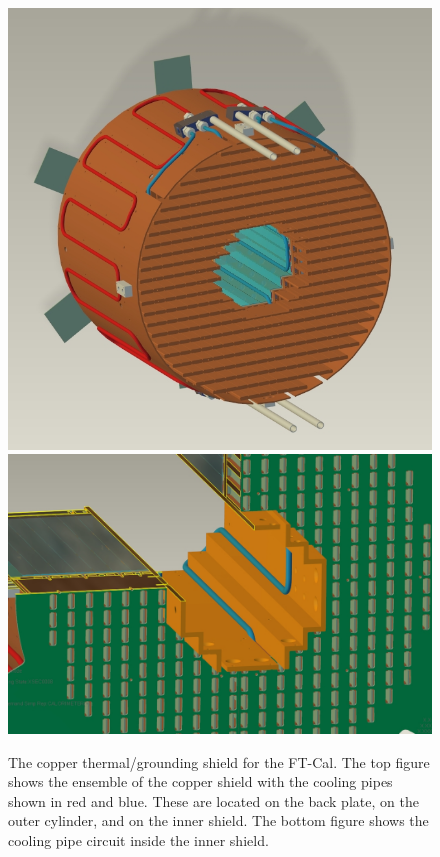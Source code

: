 \begin{figure}[th!]
\centering 
\includegraphics[width=1.0\columnwidth]{./fig/raff.jpeg}
\includegraphics[width=1.0\columnwidth]{./fig/raff1.jpg}
\caption{The copper thermal/grounding shield for the FT-Cal. The top figure shows the ensemble of the copper
  shield with the cooling pipes shown in red and blue. These are located on the back plate, on the outer cylinder, and
  on the inner shield. The bottom figure shows the cooling pipe circuit inside the inner shield.}
\label{fig:piping} 
\end{figure}

